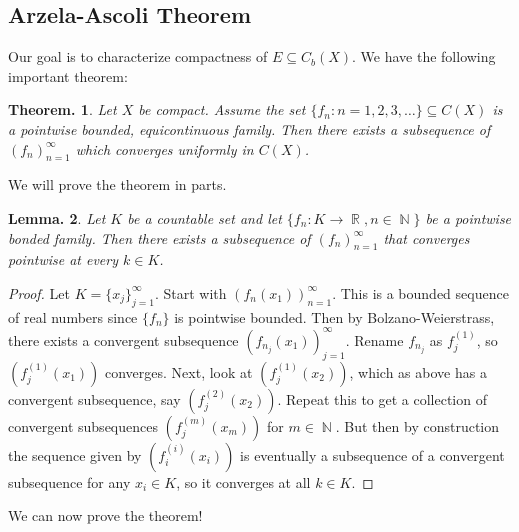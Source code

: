 \documentclass[11pt, a4paper]{memoir}
\DeclareMathOperator{\N}{{\mathbb{N}}}
\DeclareMathOperator{\R}{{\mathbb{R}}}
\theoremstyle{change}
\newtheorem{theorem}{Theorem.}[section]
\newtheorem{lemma}[theorem]{Lemma.}
\theoremstyle{plain}
\theoremstyle{nonumberplain}
\newtheorem{proof}{Proof}
\numberwithin{equation}{section}
\begin{document}
\subsection{Arzela-Ascoli Theorem}
Our goal is to characterize compactness of $E\subseteq C_b(X)$.
We have the following important theorem:
\begin{theorem}
    Let $X$ be compact.
    Assume the set $\{f_n:n=1,2,3,\ldots\}\subseteq C(X)$ is a pointwise bounded, equicontinuous family.
    Then there exists a subsequence of $(f_n)_{n=1}^\infty$ which converges uniformly in $C(X)$.
\end{theorem}
We will prove the theorem in parts.
\begin{lemma}
    Let $K$ be a countable set and let $\{f_n:K\to\R,n\in\N\}$ be a pointwise bonded family.
    Then there exists a subsequence of $(f_n)_{n=1}^\infty$ that converges pointwise at every $k\in K$.
\end{lemma}
\begin{proof}
    Let $K=\{x_j\}_{j=1}^\infty$.
    Start with $(f_n(x_1))_{n=1}^\infty$.
    This is a bounded sequence of real numbers since $\{f_n\}$ is pointwise bounded.
    Then by Bolzano-Weierstrass, there exists a convergent subsequence $(f_{n_j}(x_1))_{j=1}^\infty$.
    Rename $f_{n_j}$ as $f_j^{(1)}$, so $(f_j^{(1)}(x_1))$ converges.
    Next, look at $(f_j^{(1)}(x_2))$, which as above has a convergent subsequence, say $(f_j^{(2)}(x_2))$.
    Repeat this to get a collection of convergent subsequences $(f_j^{(m)}(x_m))$ for $m\in\N$.
    But then by construction the sequence given by $(f_i^{(i)}(x_i))$ is eventually a subsequence of a convergent subsequence for any $x_i\in K$, so it converges at all $k\in K$.
\end{proof}
We can now prove the theorem!
\end{document}
